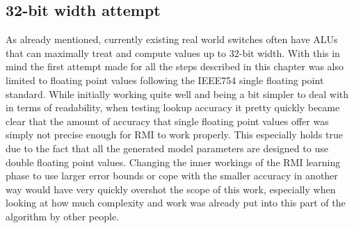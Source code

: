 \subsection{32-bit width attempt}
As already mentioned, currently existing real world switches often have ALUs that can maximally treat and compute values up to 32-bit width. With this in mind the first attempt made for all the steps described in this chapter was also limited to floating point values following the IEEE754 single floating point standard. While initially working quite well and being a bit simpler to deal with in terms of readability, when testing lookup accuracy it pretty quickly became clear that the amount of accuracy that single floating point values offer was simply not precise enough for RMI to work properly. This especially holds true due to the fact that all the generated model parameters are designed to use double floating point values. Changing the inner workings of the RMI learning phase to use larger error bounds or cope with the smaller accuracy in another way would have very quickly overshot the scope of this work, especially when looking at how much complexity and work was already put into this part of the algorithm by other people.

